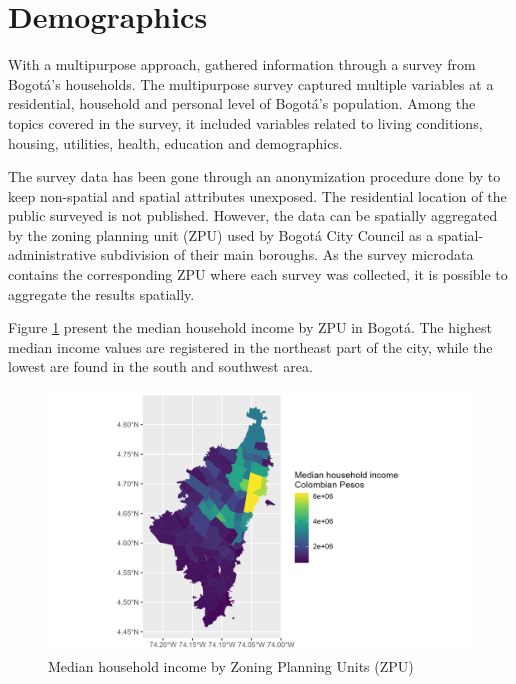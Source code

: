 \documentclass[12pt, a4paper]{report}
\begin{document}
\section{Demographics}


With a multipurpose approach, \cite{secretariadistritaldeplaneacionCapaGeograficaEncuesta2023} gathered information through a survey from Bogotá's households. The multipurpose survey captured multiple variables at a residential, household and personal level of Bogotá's population. Among the topics covered in the survey, it included variables related to living conditions, housing, utilities, health, education and demographics.

The survey data has been gone through an anonymization procedure done by \cite{secretariadistritaldeplaneacionMicrodatosEncuestaMultiproposito2023} to keep non-spatial and spatial attributes unexposed. The residential location of the public surveyed is not published. However, the data can be spatially aggregated by the zoning planning unit (ZPU) used by Bogotá City Council as a spatial-administrative subdivision of their main boroughs. As the survey microdata contains the corresponding ZPU where each survey was collected, it is possible to aggregate the results spatially. 

Figure \ref{fig:Demo_Income_ZPU} present the median household income by ZPU in Bogotá. The highest median income values are registered in the northeast part of the city, while the lowest are found in the south and southwest area.

\begin{figure}[H]
    \centering
    \includegraphics[width=15cm]{Data/Results/Images/Demo_Income_UPZ_Mean_Median.png}
    \caption{Median household income by Zoning Planning Units (ZPU) \citep{secretariadistritaldeplaneacionMicrodatosEncuestaMultiproposito2023, secretariadistritaldeplaneacionCapaGeograficaEncuesta2023} }
    \label{fig:Demo_Income_ZPU}
\end{figure}
\end{document}
